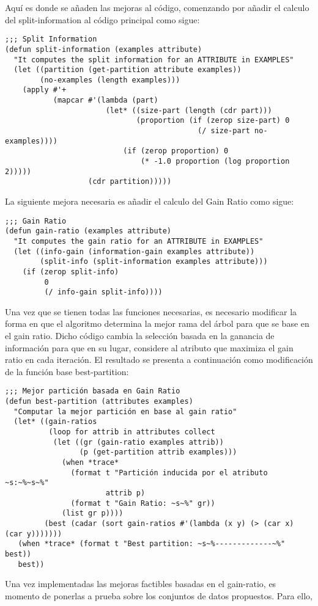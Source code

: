 \documentclass[11pt, letterpaper]{article}
\begin{document}
Aquí es donde se añaden las mejoras al código, comenzando por añadir el calculo del split-information al código principal como sigue:

\begin{verbatim}
;;; Split Information
(defun split-information (examples attribute)
  "It computes the split information for an ATTRIBUTE in EXAMPLES"
  (let ((partition (get-partition attribute examples))
        (no-examples (length examples)))
    (apply #'+
           (mapcar #'(lambda (part)
                       (let* ((size-part (length (cdr part)))
                              (proportion (if (zerop size-part) 0
                                            (/ size-part no-examples))))
                           (if (zerop proportion) 0
                               (* -1.0 proportion (log proportion 2)))))
                   (cdr partition)))))
\end{verbatim}

La siguiente mejora necesaria es añadir el calculo del Gain Ratio como sigue:

\begin{verbatim}
;;; Gain Ratio
(defun gain-ratio (examples attribute)
  "It computes the gain ratio for an ATTRIBUTE in EXAMPLES"
  (let ((info-gain (information-gain examples attribute))
        (split-info (split-information examples attribute)))
    (if (zerop split-info)
         0
         (/ info-gain split-info))))
\end{verbatim}

Una vez que se tienen todas las funciones necesarias, es necesario modificar la forma en que el algoritmo determina la mejor rama del árbol para que se base en el gain ratio. Dicho código cambia la selección basada en la ganancia de información para que en su lugar, considere al atributo que maximiza el gain ratio en cada iteración. El resultado se presenta a continuación como modificación de la función base best-partition:

\newpage

\begin{verbatim}
;;; Mejor partición basada en Gain Ratio
(defun best-partition (attributes examples)
  "Computar la mejor partición en base al gain ratio"
  (let* ((gain-ratios
          (loop for attrib in attributes collect
           (let ((gr (gain-ratio examples attrib))
                 (p (get-partition attrib examples)))
             (when *trace*
               (format t "Partición inducida por el atributo ~s:~%~s~%"
                       attrib p)
               (format t "Gain Ratio: ~s~%" gr))
             (list gr p))))
         (best (cadar (sort gain-ratios #'(lambda (x y) (> (car x) (car y)))))))
   (when *trace* (format t "Best partition: ~s~%-------------~%" best))
   best))
\end{verbatim}

\newpage

Una vez implementadas las mejoras factibles basadas en el gain-ratio, es momento de ponerlas a prueba sobre los conjuntos de datos propuestos. Para ello, 






\end{document}
